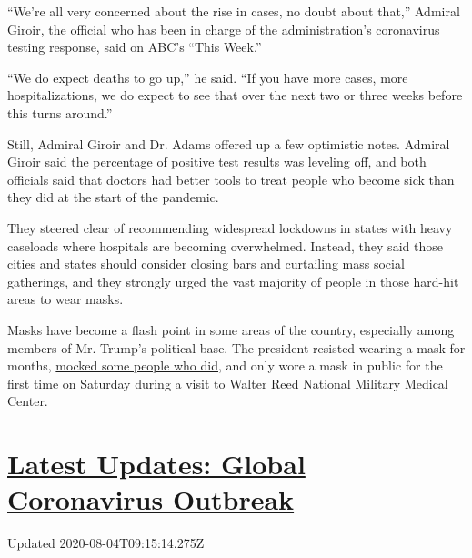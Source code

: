 ``We're all very concerned about the rise in cases, no doubt about
that,'' Admiral Giroir, the official who has been in charge of the
administration's coronavirus testing response, said on ABC's ``This
Week.''

``We do expect deaths to go up,'' he said. ``If you have more cases,
more hospitalizations, we do expect to see that over the next two or
three weeks before this turns around.''

Still, Admiral Giroir and Dr. Adams offered up a few optimistic notes.
Admiral Giroir said the percentage of positive test results was leveling
off, and both officials said that doctors had better tools to treat
people who become sick than they did at the start of the pandemic.

They steered clear of recommending widespread lockdowns in states with
heavy caseloads where hospitals are becoming overwhelmed. Instead, they
said those cities and states should consider closing bars and curtailing
mass social gatherings, and they strongly urged the vast majority of
people in those hard-hit areas to wear masks.

Masks have become a flash point in some areas of the country, especially
among members of Mr. Trump's political base. The president resisted
wearing a mask for months,
\href{https://www.washingtonpost.com/politics/trumps-mockery-of-wearing-masks-divides-republicans/2020/05/26/2c2bdc02-9f61-11ea-81bb-c2f70f01034b_story.html}{mocked
some people who did,} and only wore a mask in public for the first time
on Saturday during a visit to Walter Reed National Military Medical
Center.

\hypertarget{latest-updates-global-coronavirus-outbreak}{%
\section{\texorpdfstring{\href{https://www.nytimes.com/2020/08/04/world/coronavirus-covid-19.html?action=click\&pgtype=Article\&state=default\&region=MAIN_CONTENT_1\&context=storylines_live_updates}{Latest
Updates: Global Coronavirus
Outbreak}}{Latest Updates: Global Coronavirus Outbreak}}\label{latest-updates-global-coronavirus-outbreak}}

Updated 2020-08-04T09:15:14.275Z

